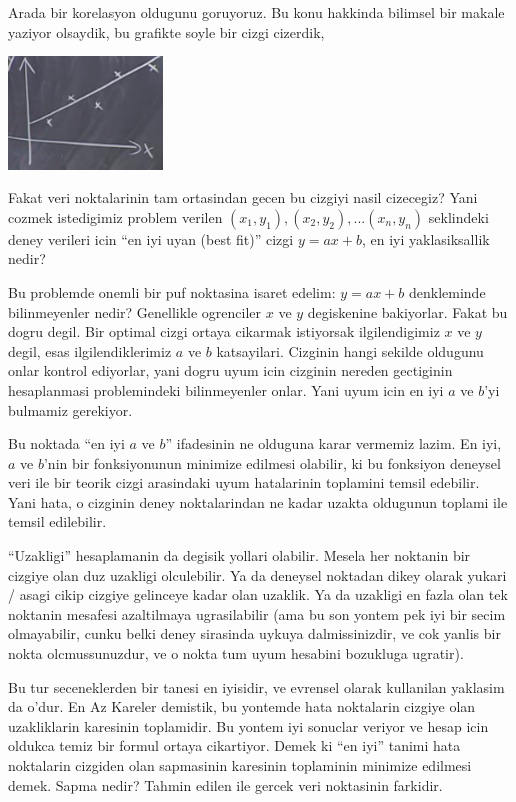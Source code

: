 \documentclass[12pt,fleqn]{article}
\begin{document}
Arada bir korelasyon oldugunu goruyoruz. Bu konu hakkinda bilimsel bir
makale yaziyor olsaydik, bu grafikte soyle bir cizgi cizerdik, 

\includegraphics[height=3cm]{9_6.png}

Fakat veri noktalarinin tam ortasindan gecen bu cizgiyi nasil cizecegiz?
Yani cozmek istedigimiz problem verilen $(x_1,y_1), (x_2,y_2),...(x_n,y_n)$
seklindeki deney verileri icin ``en iyi uyan (best fit)'' cizgi $y=ax + b$,
en iyi yaklasiksallik nedir? 

Bu problemde onemli bir puf noktasina isaret edelim: $y=ax + b$ denkleminde
bilinmeyenler nedir? Genellikle ogrenciler $x$ ve $y$ degiskenine
bakiyorlar. Fakat bu dogru degil. Bir optimal cizgi ortaya cikarmak
istiyorsak ilgilendigimiz $x$ ve $y$ degil, esas ilgilendiklerimiz $a$ ve
$b$ katsayilari. Cizginin hangi sekilde oldugunu onlar kontrol ediyorlar,
yani dogru uyum icin cizginin nereden gectiginin hesaplanmasi problemindeki
bilinmeyenler onlar. Yani uyum icin en iyi $a$ ve $b$'yi bulmamiz
gerekiyor.

Bu noktada ``en iyi $a$ ve $b$'' ifadesinin ne olduguna karar vermemiz
lazim. En iyi, $a$ ve $b$'nin bir fonksiyonunun minimize edilmesi olabilir,
ki bu fonksiyon deneysel veri ile bir teorik cizgi arasindaki uyum
hatalarinin toplamini temsil edebilir. Yani hata, o cizginin deney
noktalarindan ne kadar uzakta oldugunun toplami ile temsil edilebilir.

``Uzakligi'' hesaplamanin da degisik yollari olabilir. Mesela her noktanin
bir cizgiye olan duz uzakligi olculebilir. Ya da deneysel noktadan dikey
olarak yukari / asagi cikip cizgiye gelinceye kadar olan uzaklik. Ya da
uzakligi en fazla olan tek noktanin mesafesi azaltilmaya ugrasilabilir (ama
bu son yontem pek iyi bir secim olmayabilir, cunku belki deney sirasinda
uykuya dalmissinizdir, ve cok yanlis bir nokta olcmussunuzdur, ve o nokta
tum uyum hesabini bozukluga ugratir).

Bu tur seceneklerden bir tanesi en iyisidir, ve evrensel olarak kullanilan
yaklasim da o'dur. En Az Kareler demistik, bu yontemde hata noktalarin
cizgiye olan uzakliklarin karesinin toplamidir. Bu yontem iyi sonuclar
veriyor ve hesap icin oldukca temiz bir formul ortaya cikartiyor. Demek ki
``en iyi'' tanimi hata noktalarin cizgiden olan sapmasinin karesinin
toplaminin minimize edilmesi demek. Sapma nedir? Tahmin edilen ile gercek
veri noktasinin farkidir. 
\end{document}
